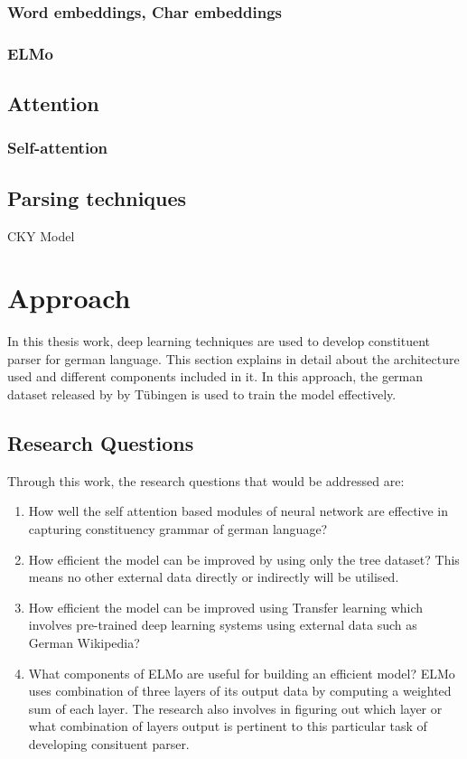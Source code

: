 \documentclass[a4paper, 11pt]{article}
\begin{document}
\subsubsection{Word embeddings, Char embeddings}


\subsubsection{ELMo}


\subsection{Attention}

\subsubsection{Self-attention}

\subsection{Parsing techniques}

CKY Model

\pagebreak
\section{Approach}  

In this thesis work, deep learning techniques are used to develop constituent parser for german language. This section explains in detail about the architecture used and different components included in it. In this approach, the german dataset released by by Tübingen is used to train the model effectively.

\subsection{Research Questions}

Through this work, the research questions that would be addressed are:
\begin{enumerate}
\item How well the self attention based modules of neural network are effective in capturing constituency grammar of german language? 
\item How efficient the model can be improved by using only the tree dataset? This means no other external data directly or indirectly will be utilised. 
\item How efficient the model can be improved using Transfer learning which involves pre-trained deep learning systems using external data such as German Wikipedia?
\item What components of ELMo are useful for building an efficient model? ELMo uses combination of three layers of its output data by computing a weighted sum of each layer. The research also involves in figuring out which layer or what combination of layers output is pertinent to this particular task of developing consituent parser.
\end{enumerate}
\end{document}
